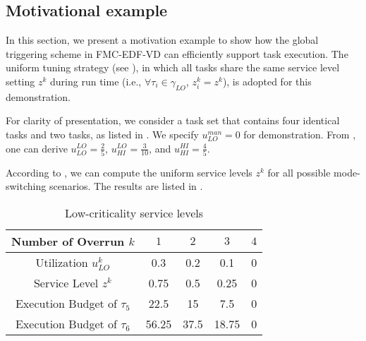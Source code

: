 \documentclass[10pt,journal,compsoc]{IEEEtran}
\begin{document}
\subsection{Motivational example}
In this section, we present a motivation example to show how the global triggering scheme in FMC-EDF-VD can efficiently support \lo task execution. The uniform tuning strategy (see ), in which all \lo tasks share the same service level setting $z^k$ during run time (i.e., $\forall\tau_i\in{}\gamma_{LO}$, $z_i^k=z^k$), is adopted for this demonstration.   
\begin{example}
\label{example1}
For clarity of presentation, we consider a task set that contains four identical \hi tasks and two \lo tasks, as listed in . We specify $u_{LO}^{man}=0$ for demonstration. From , one can derive $u_{LO}^{LO}=\frac{2}{5}$, $u_{HI}^{LO}=\frac{3}{10}$, and $u_{HI}^{HI}=\frac{4}{5}$. 
\end{example}

According to , we can compute the uniform service levels $z^k$ for all possible mode-switching scenarios. The results are listed in .

\begin{table}[h]
\centering
\caption{Low-criticality service levels}
\label{ex:e2}
\begin{tabular}{|c|c|c|c|c|}
\hline
Number of Overrun $k$    & $1$   & $2$    & $3$    & $4$  \\ \hline
Utilization $u_{LO}^{k}$ & 0.3   & 0.2    & 0.1    & 0  \\ \hline
Service Level $z^k$      & 0.75  & 0.5    & 0.25   & 0  \\ \hline
Execution Budget of $\tau_5$      & 22.5   & 15      & 7.5      & 0 \\ \hline
Execution Budget of $\tau_6$      & 56.25   & 37.5      & 18.75      & 0 \\ \hline
\end{tabular}
\end{table}
\end{document}
